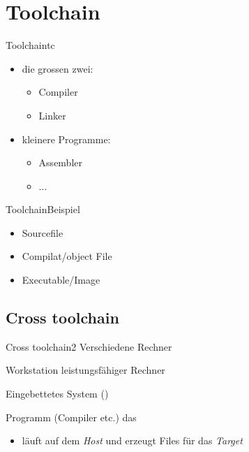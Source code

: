 \setlength{\TPHorizModule}{1mm}
\setlength{\TPVertModule}{1mm}

\newcommand{\qemu}{{\em qemu}\xspace}
\newcommand{\busybox}{{\em busybox}\xspace}
\newcommand{\yocto}{{\em yocto}\xspace}

\section{Toolchain}
\begin{frame}{Toolchain}{tc}
 \begin{itemize}
  \item die grossen zwei:
  \begin{itemize}
  \item Compiler
  \item Linker
  \end{itemize}
  \item kleinere Programme:
  \begin{itemize}
   \item Assembler
   \item ...
  \end{itemize}
 \end{itemize}
\end{frame}

\begin{frame}{Toolchain}{Beispiel}
 \begin{itemize}
  \item Sourcefile 
  \item Compilat/object File 
  \item Executable/Image 
 \end{itemize}
\end{frame}

\subsection{Cross toolchain}
\begin{frame}{Cross toolchain}{2 Verschiedene Rechner}
\begin{description}
 \item[Host] Workstation leistungsfähiger Rechner
 \item[Target] Eingebettetes System (\beaglebone)
 \item[Cross\{Programm\}] Programm (Compiler etc.) das
 \begin{itemize}
  \item läuft auf dem {\em Host} und erzeugt Files für das {\em Target}
 \end{itemize}
\end{description}
\end{frame}

